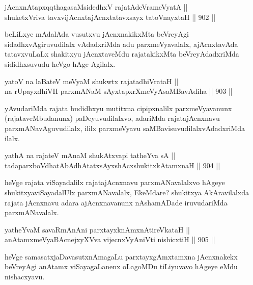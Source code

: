 \begin{shl}
jAcnxnAtapxqqthagasaMsidedhxV rajatAdeVrameVyatA || \\
shuketxVriva tavxvijAcnxtajAcnxtatavxsayx tatoV\s nayxtaH \hfill || 902 ||  
\end{shl}

\begin{artha}
beLiLxye mAdalAda vusutxvu jAcnxnakikxMta beVreyAgi sidadhxvAgiruvudilalx vAdadxriMda adu parxmeVyavalalx, ajAcnxtavAda tatavxvuLaLx shakitxyu jAcnxtaveMdu rajatakikxMta beVreyAdadxriMda sididhxsuvudu heVgo hAge Agilalx.
\end{artha}

\begin{shl}
yatoV na laBateV meVyaM shukwtx rajatadhiVrataH || \\
na rUpayxdhiVH parxmANaM sAyxtapxrXmeVyAsaMBavAdiha \hfill || 903 ||  
\end{shl}

\begin{artha}
yAvudariMda rajata budidhxyu mutitxna cipipxnalilx parxmeVyavanunx (rajataveMbudanunx) paDeyuvudilalxvo, adariMda rajatajAcnxnavu parxmANavAguvudilalx, ililx parxmeVyavu saMBavisuvudilalxvAdadxriMda ilalx.
\end{artha}

\begin{shl}
yathA na rajateV mAnaM shukAtxvapi tatheYva sA || \\
tadaparxboVdhatAbAdhAtatxsAyxshAcxshukitxkAtamxnaH \hfill || 904 ||  
\end{shl}

\begin{artha}
heVge rajata viSayadalilx rajatajAcnxnavu parxmANavalalxvo hAgeye shukitxyaviSayadalUlx parxmANavalalx, EkeMdare? shukitxya AkAravilalxda rajata jAcnxnavu adara ajAcnxnavanunx nAshamADade iruvudariMda parxmANavalalx.
\end{artha}


\begin{shl}
yatheYvaM savaRmAnAni parxtayxknAmxnAtireVkataH || \\
anAtamxmeVyaBAcnejxyXVva vijecnxVyAniVti nishicxtiH \hfill || 905 ||  
\end{shl}

\begin{artha}
heVge samasatxjaDavasutxnAmagaLu parxtayxgAmxtamxna jAcnxnakekx beVreyAgi anAtamx viSayagaLanenx oLagoMDu tiLiyuvavo hAgeye eMdu nishacxyavu.
\end{artha}

